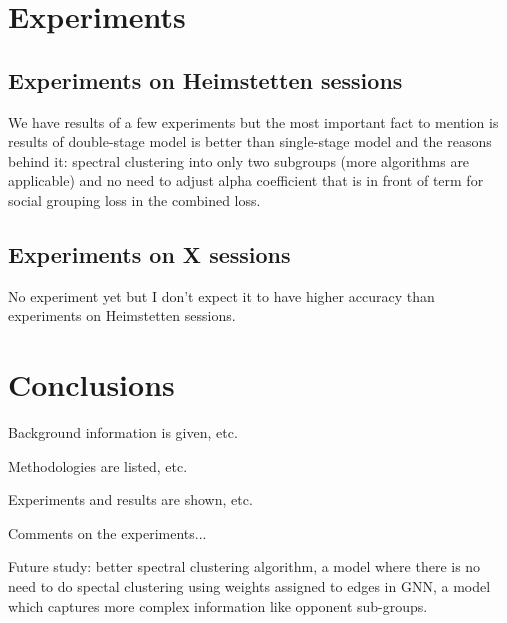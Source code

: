 \documentclass[doctype=mastersthesis,lang=english,BCOR=15mm,biblatex]{ldvbook}
\begin{document}
\chapter{Experiments}

\section{Experiments on Heimstetten sessions}

We have results of a few experiments but the most important fact to mention is results of double-stage model is better than single-stage model and the reasons behind it: spectral clustering into only two subgroups (more algorithms are applicable) and no need to adjust alpha coefficient that is in front of term for social grouping loss in the combined loss.

\section{Experiments on X sessions}

No experiment yet but I don't expect it to have higher accuracy than experiments on Heimstetten sessions.

\chapter{Conclusions}

Background information is given, etc.

Methodologies are listed, etc.

Experiments and results are shown, etc.

Comments on the experiments...

Future study: better spectral clustering algorithm, a model where there is no need to do spectal clustering using weights assigned to edges in GNN, a model which captures more complex information like opponent sub-groups.

\printbibliography[heading=bibintoc,title={Bibliography}]
\end{document}
